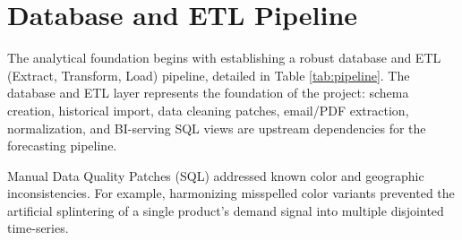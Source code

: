 \section{Database and ETL Pipeline}
The analytical foundation begins with establishing a robust database and ETL (Extract, Transform, Load) pipeline, detailed in Table \ref{tab:pipeline}. The database and ETL layer represents the foundation of the project: schema creation, historical import, data cleaning patches, email/PDF extraction, normalization, and BI-serving SQL views are upstream dependencies for the forecasting pipeline.



Manual Data Quality Patches (SQL) addressed known color and geographic inconsistencies. For example, harmonizing misspelled color variants prevented the artificial splintering of a single product's demand signal into multiple disjointed time-series.
\FloatBarrier
